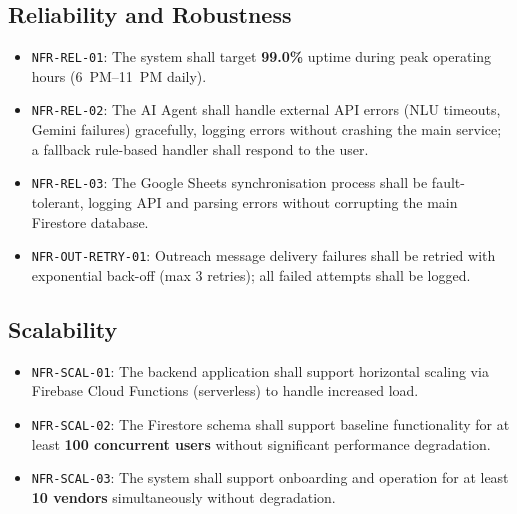 \subsection{Reliability and Robustness}
\begin{itemize}
  \item \texttt{NFR-REL-01}: The system shall target \textbf{99.0\%} uptime during
        peak operating hours (6~PM--11~PM daily).
  \item \texttt{NFR-REL-02}: The AI Agent shall handle external API errors (NLU
        timeouts, Gemini failures) gracefully, logging errors without crashing the
        main service; a fallback rule-based handler shall respond to the user.
  \item \texttt{NFR-REL-03}: The Google Sheets synchronisation process shall be
        fault-tolerant, logging API and parsing errors without corrupting the main
        Firestore database.
  \item \texttt{NFR-OUT-RETRY-01}: Outreach message delivery failures shall be retried
        with exponential back-off (max 3 retries); all failed attempts shall be logged.
\end{itemize}

\subsection{Scalability}
\begin{itemize}
  \item \texttt{NFR-SCAL-01}: The backend application shall support horizontal scaling
        via Firebase Cloud Functions (serverless) to handle increased load.
  \item \texttt{NFR-SCAL-02}: The Firestore schema shall support baseline functionality
        for at least \textbf{100 concurrent users} without significant performance
        degradation.
  \item \texttt{NFR-SCAL-03}: The system shall support onboarding and operation for
        at least \textbf{10 vendors} simultaneously without degradation.
\end{itemize}

